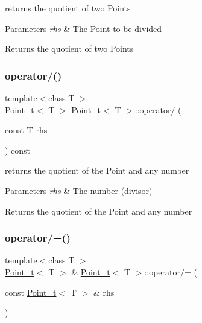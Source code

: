 returns the quotient of two Points 


\begin{DoxyParams}{Parameters}
{\em rhs} & The Point to be divided\\
\hline
\end{DoxyParams}
\begin{DoxyReturn}{Returns}
the quotient of two Points 
\end{DoxyReturn}
\mbox{\label{class_point__t_ac7987146c54aa27b05399048598634c3}} 
\subsubsection{\texorpdfstring{operator/()}{operator/()}\hspace{0.1cm}{\footnotesize\ttfamily [2/2]}}
{\footnotesize\ttfamily template$<$class T $>$ \\
\hyperlink{class_point__t}{Point\+\_\+t}$<$ T $>$ \hyperlink{class_point__t}{Point\+\_\+t}$<$ T $>$\+::operator/ (\begin{DoxyParamCaption}\item[{const T}]{rhs }\end{DoxyParamCaption}) const}



returns the quotient of the Point and any number 


\begin{DoxyParams}{Parameters}
{\em rhs} & The number (divisor)\\
\hline
\end{DoxyParams}
\begin{DoxyReturn}{Returns}
the quotient of the Point and any number 
\end{DoxyReturn}
\mbox{\label{class_point__t_a7d548221c6fbe6401682052a5121aa9b}} 
\subsubsection{\texorpdfstring{operator/=()}{operator/=()}\hspace{0.1cm}{\footnotesize\ttfamily [1/2]}}
{\footnotesize\ttfamily template$<$class T $>$ \\
\hyperlink{class_point__t}{Point\+\_\+t}$<$ T $>$ \& \hyperlink{class_point__t}{Point\+\_\+t}$<$ T $>$\+::operator/= (\begin{DoxyParamCaption}\item[{const \hyperlink{class_point__t}{Point\+\_\+t}$<$ T $>$ \&}]{rhs }\end{DoxyParamCaption})}



